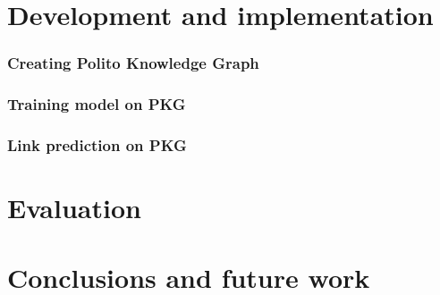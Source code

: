 \documentclass[%
    corpo=13.5pt,
    twoside,
    oldstyle,
    tipotesi=magistrale,
    greek,
    evenboxes
]{toptesi}
\begin{document}
\chapter{Development and implementation}




\subsection{Creating Polito Knowledge Graph}

\subsection{Training model on PKG}

\subsection{Link prediction on PKG}

\chapter{Evaluation}


\chapter{Conclusions and future work}





\end{document}
